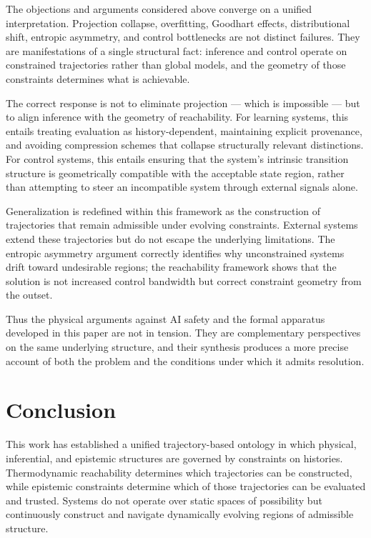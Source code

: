\documentclass[12pt]{article}
\theoremstyle{plain}
\theoremstyle{definition}
\theoremstyle{remark}
\begin{document}
The objections and arguments considered above converge on a unified interpretation. Projection collapse, overfitting, Goodhart effects, distributional shift, entropic asymmetry, and control bottlenecks are not distinct failures. They are manifestations of a single structural fact: inference and control operate on constrained trajectories rather than global models, and the geometry of those constraints determines what is achievable.

The correct response is not to eliminate projection — which is impossible — but to align inference with the geometry of reachability. For learning systems, this entails treating evaluation as history-dependent, maintaining explicit provenance, and avoiding compression schemes that collapse structurally relevant distinctions. For control systems, this entails ensuring that the system's intrinsic transition structure is geometrically compatible with the acceptable state region, rather than attempting to steer an incompatible system through external signals alone.

Generalization is redefined within this framework as the construction of trajectories that remain admissible under evolving constraints. External systems extend these trajectories but do not escape the underlying limitations. The entropic asymmetry argument correctly identifies why unconstrained systems drift toward undesirable regions; the reachability framework shows that the solution is not increased control bandwidth but correct constraint geometry from the outset.

Thus the physical arguments against AI safety and the formal apparatus developed in this paper are not in tension. They are complementary perspectives on the same underlying structure, and their synthesis produces a more precise account of both the problem and the conditions under which it admits resolution.

\section{Conclusion}

This work has established a unified trajectory-based ontology in which physical, inferential, and epistemic structures are governed by constraints on histories. Thermodynamic reachability determines which trajectories can be constructed, while epistemic constraints determine which of those trajectories can be evaluated and trusted. Systems do not operate over static spaces of possibility but continuously construct and navigate dynamically evolving regions of admissible structure.
\end{document}

